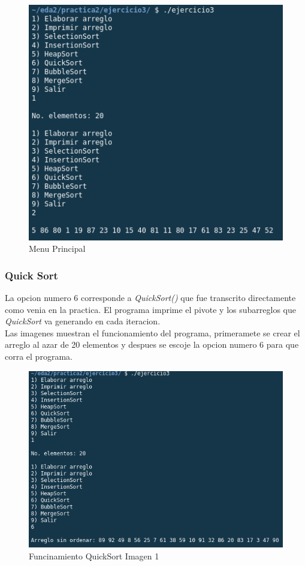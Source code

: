 \documentclass{article}
\begin{document}
		\begin{figure}[H]
			\centering
			\includegraphics[scale = 0.8]{images/e3menu.png}
			\caption{Menu Principal}
		\end{figure}
		
		\subsubsection{Quick Sort}
		
		La opcion numero 6 corresponde a \emph{QuickSort()} que fue transcrito directamente como venia en la practica. El programa imprime el pivote y los subarreglos que \emph{QuickSort} va generando en cada iteracion.\\
		
		Las imagenes muestran el funcionamiento del programa, primeramete se crear el arreglo al azar de 20 elementos y despues se escoje la opcion numero 6 para que corra el programa.
		
		\begin{figure}[H]
			\centering
			\includegraphics[scale = 0.8]{images/e3q1.png}
			\caption{Funcinamiento QuickSort Imagen 1}
		\end{figure}
	
\end{document}
